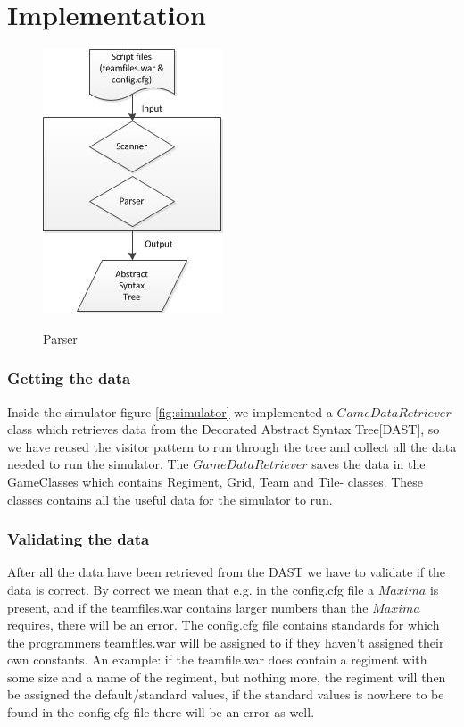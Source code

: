 \section{Implementation}

\begin{figure}[H]
\centering
\includegraphics[scale=1]{rapport/6/figures/parser}
\label{fig:parser}
\caption{Parser}
\end{figure}

\subsubsection{Getting the data}
Inside the simulator figure \ref{fig:simulator} we implemented a $GameDataRetriever$ class which retrieves data from the Decorated Abstract Syntax Tree[DAST], so we have reused the visitor pattern to run through the tree and collect all the data needed to run the simulator. The $GameDataRetriever$ saves the data in the GameClasses which contains Regiment, Grid, Team and Tile- classes. These classes contains all the useful data for the simulator to run.
\subsubsection{Validating the data}
After all the data have been retrieved from the DAST we have to validate if the data is correct. By correct we mean that e.g. in the config.cfg file a $Maxima$ is present, and if the teamfiles.war contains larger numbers than the $Maxima$ requires, there will be an error. The config.cfg file contains standards for which the programmers teamfiles.war will be assigned to if they haven't assigned their own constants. An example: if the teamfile.war does contain a regiment with some size and a name of the regiment, but nothing more, the regiment will then be assigned the default/standard values, if the standard values is nowhere to be found in the config.cfg file there will be an error as well.

